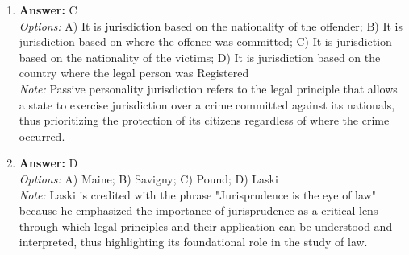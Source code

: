 \documentclass[12pt]{article}
\begin{document}
\begin{enumerate}[label=\arabic*.]
\item \textbf{Answer:} C
\\ \textit{Options:} A) It is jurisdiction based on the nationality of the offender; B) It is jurisdiction based on where the offence was committed; C) It is jurisdiction based on the nationality of the victims; D) It is jurisdiction based on the country where the legal person was Registered
\\ \textit{Note:} Passive personality jurisdiction refers to the legal principle that allows a state to exercise jurisdiction over a crime committed against its nationals, thus prioritizing the protection of its citizens regardless of where the crime occurred.
\item \textbf{Answer:} D
\\ \textit{Options:} A) Maine; B) Savigny; C) Pound; D) Laski
\\ \textit{Note:} Laski is credited with the phrase "Jurisprudence is the eye of law" because he emphasized the importance of jurisprudence as a critical lens through which legal principles and their application can be understood and interpreted, thus highlighting its foundational role in the study of law.
\end{enumerate}
\end{document}
